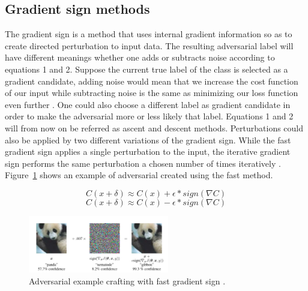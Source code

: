 \documentclass[runningheads,a4paper]{llncs}
\begin{document}
\subsection{Gradient sign methods}

The gradient sign is a method that uses internal gradient information so as to create directed perturbation to input data. The resulting adversarial label will have different meanings whether one adds or subtracts noise according to equations 1 and 2. Suppose the current true label of the class is selected as a gradient candidate, adding noise would mean that we increase the cost function of our input while subtracting noise is the same as minimizing our loss function even further \cite{goodfellow2016_book}. One could also choose a different label as gradient candidate in order to make the adversarial more or less likely that label. Equations 1 and 2 will from now on be referred as ascent and descent methods. Perturbations could also be applied by two different variations of the gradient sign. While the fast gradient sign applies a single perturbation to the input, the iterative gradient sign performs the same perturbation a chosen number of times iteratively \cite{goodfellow2014}. Figure~\ref{fig:fgsm_craft} shows an example of adversarial created using the fast method.


\begin{equation}
C(x + \delta)\approx C(x) + \epsilon * sign(\nabla C)
\end{equation}
\begin{equation}
C(x + \delta)\approx C(x) - \epsilon * sign(\nabla C)
\end{equation}
\begin{figure}
	\centering
	\includegraphics[height=2.5cm]{panda.png}
	\caption{Adversarial example crafting with fast gradient sign \cite{goodfellow2014}.}
	\label{fig:fgsm_craft}
\end{figure}
\end{document}

